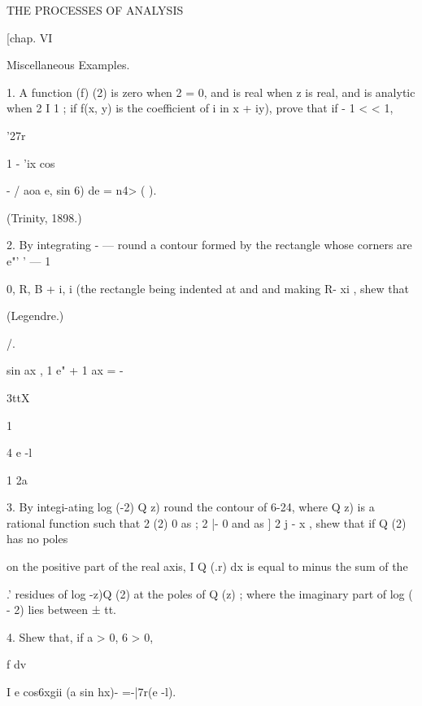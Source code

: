 THE PROCESSES OF ANALYSIS 



[chap. VI 



Miscellaneous Examples. 

1. A function (f) (2) is zero when 2 = 0, and is real when z is real, and is analytic when 
2 I   1 ; if f(x, y) is the coefficient of i in  x + iy), prove that if - 1 <  < 1, 



'27r 



1 - 'ix cos 



  - / aoa e, sin 6) de = n4> ( ). 



(Trinity, 1898.) 



2. By integrating  -  — round a contour formed by the rectangle whose corners are 
e"' ' — 1 



0, R, B + i, i (the rectangle being indented at and and making R- xi , shew that 

(Legendre.) 



/. 



sin ax , 1 e" + 1 
ax = - 



3ttX 



1 



4 e -l 



1 
2a 



3. By integi-ating log (-2) Q z) round the contour of   6-24, where Q z) is a rational 
function such that 2 (2) 0 as ; 2 |- 0 and as ] 2 j -  x , shew that if Q (2) has no poles 

on the positive part of the real axis, I Q (.r) dx is equal to minus the sum of the 

.' 
residues of log  -z)Q (2) at the poles of Q (z) ; where the imaginary part of log ( - 2) lies 
between ± tt. 

4. Shew that, if a > 0, 6 > 0, 



f dv 

I e cos6xgii  (a sin hx)-  =-|7r(e -l). 



